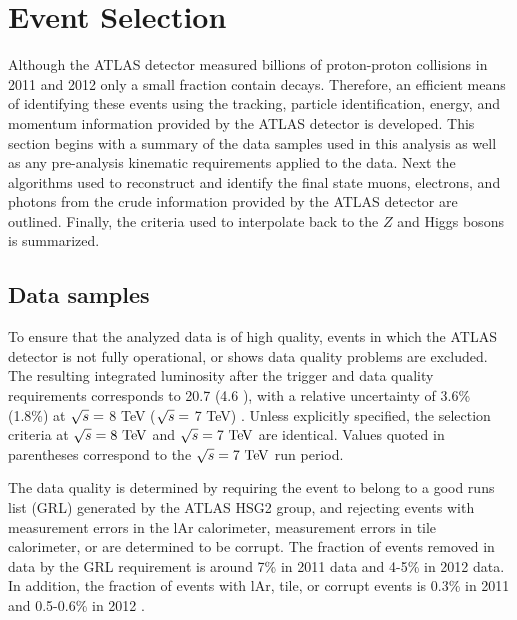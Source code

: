 \section{Event Selection}
\label{sec:event}

Although the ATLAS detector measured billions of proton-proton collisions in 2011
and 2012 only a small fraction contain \HToZg decays. Therefore, an efficient
means of identifying these events using the tracking, particle identification, 
energy, and momentum information provided by the ATLAS detector is developed.
This section begins with a summary of the data samples used in this analysis
as well as any pre-analysis kinematic requirements applied to the data.
Next the algorithms used to reconstruct and identify the final state muons,
electrons, and photons from the crude information provided by the ATLAS detector
are outlined. Finally, the criteria used to interpolate back to the $Z$ and 
Higgs bosons is summarized. 

\subsection{Data samples}
To ensure that the analyzed data is of high quality, events in which the ATLAS
detector is not fully operational, or shows data quality problems are excluded.
The resulting integrated luminosity after the trigger and data quality 
requirements corresponds to 20.7 \ifb (4.6 \ifb), with a relative uncertainty
of 3.6\% (1.8\%) at $\sqrt{s} =$ 8 TeV ($\sqrt{s} =$ 7 TeV) 
\cite{Aad:2011dr, Aad:2013ucp}.
Unless explicitly specified, the selection criteria
at $\rts = 8 \TeV$ and $\rts = 7 \TeV$ are identical. Values quoted in parentheses
correspond to the $\rts = 7 \TeV$ run period.


The data quality is determined by requiring the event to belong to a good runs list 
(GRL) generated by the ATLAS HSG2 group, and rejecting events with measurement 
errors in the lAr calorimeter, measurement errors in tile calorimeter, or are 
determined to be corrupt. 
The fraction of events removed in data by the GRL requirement
is around 7\% in 2011 data and 4-5\% in 2012 data. In addition, the fraction of
events with lAr, tile, or corrupt events is 0.3\% in 2011 and 0.5-0.6\% in 2012 
\cite{Abreu:1500529}.

